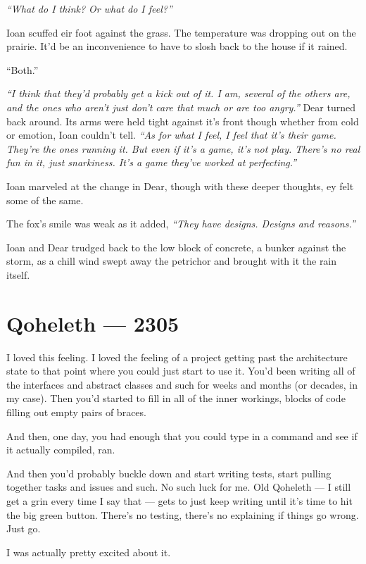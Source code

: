 \emph{``What do I think? Or what do I feel?''}

Ioan scuffed eir foot against the grass. The temperature was dropping out on the prairie. It'd be an inconvenience to have to slosh back to the house if it rained.

``Both.''

\emph{``I think that they'd probably get a kick out of it. I am, several of the others are, and the ones who aren't just don't care that much or are too angry.''} Dear turned back around. Its arms were held tight against it's front though whether from cold or emotion, Ioan couldn't tell. \emph{``As for what I feel, I feel that it's their game. They're the ones running it. But even if it's a game, it's not play. There's no real fun in it, just snarkiness. It's a game they've worked at perfecting.''}

Ioan marveled at the change in Dear, though with these deeper thoughts, ey felt some of the same.

The fox's smile was weak as it added, \emph{``They have designs. Designs and reasons.''}

Ioan and Dear trudged back to the low block of concrete, a bunker against the storm, as a chill wind swept away the petrichor and brought with it the rain itself.

\chapter*{Qoheleth — 2305}

I loved this feeling. I loved the feeling of a project getting past the architecture state to that point where you could just start to use it. You'd been writing all of the interfaces and abstract classes and such for weeks and months (or decades, in my case). Then you'd started to fill in all of the inner workings, blocks of code filling out empty pairs of braces.

And then, one day, you had enough that you could type in a command and see if it actually compiled, ran.

And then you'd probably buckle down and start writing tests, start pulling together tasks and issues and such. No such luck for me. Old Qoheleth --- I still get a grin every time I say that --- gets to just keep writing until it's time to hit the big green button. There's no testing, there's no explaining if things go wrong. Just go.

I was actually pretty excited about it.

